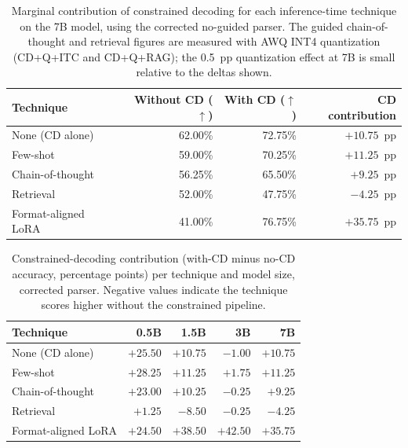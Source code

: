 \begin{table}[ht]
\centering
\caption{Marginal contribution of constrained decoding for each
inference-time technique on the 7B model, using the corrected
no-guided parser. The guided chain-of-thought and retrieval figures
are measured with AWQ INT4 quantization (CD+Q+ITC and CD+Q+RAG); the
0.5~pp quantization effect at 7B is small relative to the deltas shown.}
\label{tab:cd-contribution-ref}
\begin{tabular}{lrrr}
\toprule
Technique & Without CD ($\uparrow$) & With CD ($\uparrow$) & CD contribution \\
\midrule
None (CD alone)     & 62.00\% & 72.75\% & $+10.75$~pp \\
Few-shot            & 59.00\% & 70.25\% & $+11.25$~pp \\
Chain-of-thought    & 56.25\% & 65.50\% & $+9.25$~pp  \\
Retrieval           & 52.00\% & 47.75\% & $-4.25$~pp  \\
Format-aligned LoRA & 41.00\% & 76.75\% & $+35.75$~pp \\
\bottomrule
\end{tabular}
\end{table}

\begin{table}[ht]
\centering
\caption{Constrained-decoding contribution (with-CD minus no-CD
accuracy, percentage points) per technique and model size, corrected
parser. Negative values indicate the technique scores higher without
the constrained pipeline.}
\label{tab:cd-contribution-sizes}
\begin{tabular}{lrrrr}
\toprule
Technique & 0.5B & 1.5B & 3B & 7B \\
\midrule
None (CD alone)     & $+25.50$ & $+10.75$ & $-1.00$  & $+10.75$ \\
Few-shot            & $+28.25$ & $+11.25$ & $+1.75$  & $+11.25$ \\
Chain-of-thought    & $+23.00$ & $+10.25$ & $-0.25$  & $+9.25$  \\
Retrieval           & $+1.25$  & $-8.50$  & $-0.25$  & $-4.25$  \\
Format-aligned LoRA & $+24.50$ & $+38.50$ & $+42.50$ & $+35.75$ \\
\bottomrule
\end{tabular}
\end{table}
